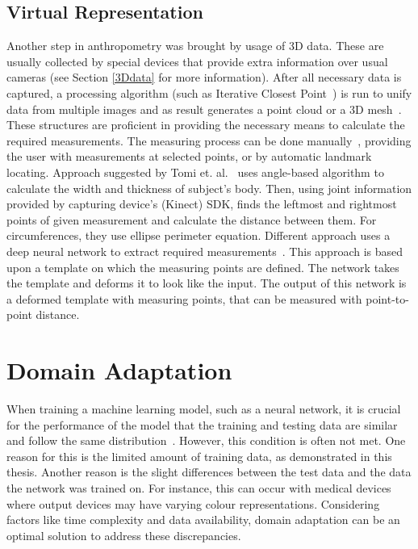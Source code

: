 \subsection{Virtual Representation}
Another step in anthropometry was brought by usage of 3D data. These are usually collected by special devices that provide extra information over usual cameras (see Section \ref{3Ddata} for more information). After all necessary data is captured, a processing algorithm (such as Iterative Closest Point~\cite{pointcloudProcess}) is run to unify data from multiple images and as result generates a point cloud or a 3D mesh~\cite{digitalAnthro}. These structures are proficient in providing the necessary means to calculate the required measurements. The measuring process can be done manually~\cite{3Dextraction}, providing the user with measurements at selected points, or by automatic landmark locating. Approach suggested by Tomi et. al.~\cite{kinect} uses angle-based algorithm to calculate the width and thickness of subject's body. Then, using joint information provided by capturing device's (Kinect) SDK, finds the leftmost and rightmost points of given measurement and calculate the distance between them. For circumferences, they use ellipse perimeter equation. Different approach uses a deep neural network to extract required measurements~\cite{pointcloudNN}. This approach is based upon a template on which the measuring points are defined. The network takes the template and deforms it to look like the input. The output of this network is a deformed template with measuring points, that can be measured with point-to-point distance.


\section{Domain Adaptation}
When training a machine learning model, such as a neural network, it is crucial for the performance of the model that the training and testing data are similar and follow the same distribution~\cite{domainAdaptation}. However, this condition is often not met. One reason for this is the limited amount of training data, as demonstrated in this thesis. Another reason is the slight differences between the test data and the data the network was trained on. For instance, this can occur with medical devices where output devices may have varying colour representations. Considering factors like time complexity and data availability, domain adaptation can be an optimal solution to address these discrepancies.

